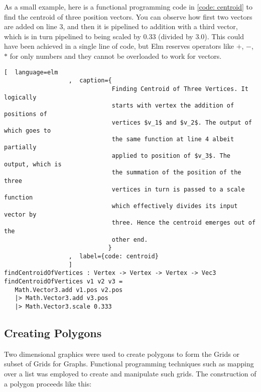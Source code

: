 As a small example, here is a functional programming code in \autoref{code:
centroid} to find the centroid of three position vectors. You can observe
how first two vectors are added on line 3, and then it is pipelined to addition
with a third vector, which is in turn pipelined to being scaled by $0.33$
(divided by $3.0$). This could have been achieved in a single line of code, but
Elm reserves operators like $+$, $-$, $*$ for only numbers and they cannot be
overloaded to work for vectors.


\begin{lstlisting}[  language=elm
                  ,  caption={
                              Finding Centroid of Three Vertices. It logically
                              starts with vertex the addition of positions of
                              vertices $v_1$ and $v_2$. The output of which goes to
                              the same function at line 4 albeit partially
                              applied to position of $v_3$. The output, which is
                              the summation of the position of the three
                              vertices in turn is passed to a scale function
                              which effectively divides its input vector by
                              three. Hence the centroid emerges out of the
                              other end.
                             }
                  ,  label={code: centroid}
                  ]
findCentroidOfVertices : Vertex -> Vertex -> Vertex -> Vec3
findCentroidOfVertices v1 v2 v3 =
   Math.Vector3.add v1.pos v2.pos
   |> Math.Vector3.add v3.pos
   |> Math.Vector3.scale 0.333
\end{lstlisting}

\subsection{Creating Polygons}
Two dimensional graphics were used to create polygons to form the Grids
or subset of Grids for Graphs. Functional programming techniques such as mapping
over a list was employed to create and manipulate such grids. 
The construction of a polygon proceeds like this:


